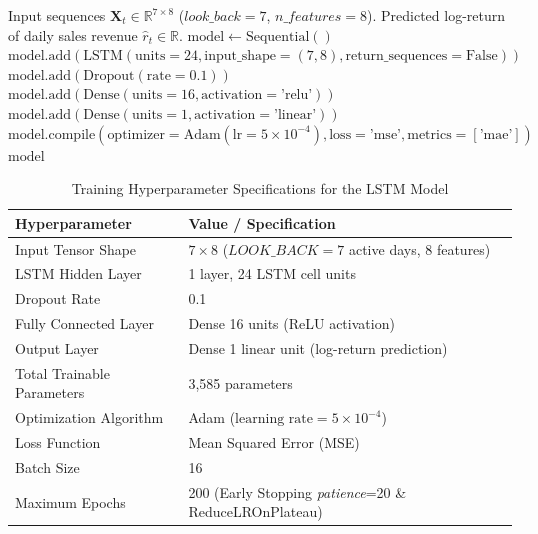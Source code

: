 \documentclass[10pt,a4paper]{article}
\begin{document}
\begin{algorithm}[htbp]
\caption{Construction of Hybrid Residual LSTM Model Using TensorFlow/Keras}
\label{alg:lstm_model}
\fontsize{8.5pt}{10.5pt}\selectfont
\begin{algorithmic}[1]
\Require Input sequences $\mathbf{X}_t \in \mathbb{R}^{7 \times 8}$ ($look\_back = 7$, $n\_features = 8$).
\Ensure Predicted log-return of daily sales revenue $\hat{r}_t \in \mathbb{R}$.
\State $\text{model} \gets \text{Sequential}()$
\State $\text{model}.\text{add}(\text{LSTM}(\text{units}=24, \text{input\_shape}=(7, 8), \text{return\_sequences}=\text{False}))$
\State $\text{model}.\text{add}(\text{Dropout}(\text{rate}=0.1))$
\State $\text{model}.\text{add}(\text{Dense}(\text{units}=16, \text{activation}=\text{'relu'}))$
\State $\text{model}.\text{add}(\text{Dense}(\text{units}=1, \text{activation}=\text{'linear'}))$
\State $\text{model}.\text{compile}(\text{optimizer}=\text{Adam}(\text{lr}=5 \times 10^{-4}), \text{loss}=\text{'mse'}, \text{metrics}=[\text{'mae'}])$
\State \Return $\text{model}$
\end{algorithmic}
\end{algorithm}

\begin{table}[htbp]
  \centering
  \caption{Training Hyperparameter Specifications for the LSTM Model}
  \label{tab:param_pelatihan}
  \fontsize{8.5pt}{11pt}\selectfont
  \begin{tabular}{ll}
    \toprule
    \textbf{Hyperparameter} & \textbf{Value / Specification} \\
    \midrule
    Input Tensor Shape & $7 \times 8$ ($LOOK\_BACK = 7$ active days, 8 features) \\
    LSTM Hidden Layer & 1 layer, 24 LSTM cell units \\
    Dropout Rate & 0.1 \\
    Fully Connected Layer & Dense 16 units (ReLU activation) \\
    Output Layer & Dense 1 linear unit (log-return prediction) \\
    Total Trainable Parameters & 3,585 parameters \\
    Optimization Algorithm & Adam ($\text{learning rate} = 5 \times 10^{-4}$) \\
    Loss Function & Mean Squared Error (MSE) \\
    Batch Size & 16 \\
    Maximum Epochs & 200 (Early Stopping \textit{patience}=20 \& ReduceLROnPlateau) \\
    \bottomrule
  \end{tabular}
\end{table}
\end{document}
